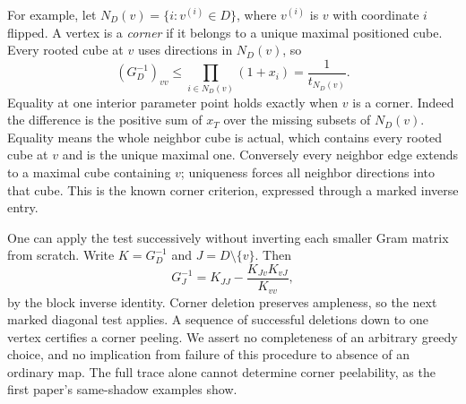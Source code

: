 \documentclass[11pt]{article}
\theoremstyle{definition}
\begin{document}
For example, let $N_D(v)=\{i:v^{(i)}\in D\}$,
where $v^{(i)}$ is $v$ with coordinate $i$ flipped. A vertex is a
\emph{corner} if it belongs to a unique maximal positioned cube.
Every rooted cube at $v$ uses directions in $N_D(v)$, so
\begin{equation}\label{eq:corner-diagonal}
 (G_D^{-1})_{vv}\le\prod_{i\in N_D(v)}(1+x_i)
                   =\frac{1}{t_{N_D(v)}}.
\end{equation}
Equality at one interior parameter point holds exactly when $v$ is a corner.
Indeed the difference is the positive sum of $x_T$ over the missing
subsets of $N_D(v)$. Equality means the whole neighbor cube is actual,
which contains every rooted cube at $v$ and is the unique maximal one.
Conversely every neighbor edge extends to a maximal cube containing $v$;
uniqueness forces all neighbor directions into that cube. This is the
known corner criterion, expressed through a marked inverse entry.

One can apply the test successively without inverting each smaller Gram
matrix from scratch. Write $K=G_D^{-1}$ and $J=D\setminus\{v\}$. Then
\[
 G_J^{-1}=K_{JJ}-\frac{K_{Jv}K_{vJ}}{K_{vv}},
\]
by the block inverse identity. Corner deletion preserves ampleness, so the
next marked diagonal test applies. A sequence of successful deletions down
to one vertex certifies a corner peeling. We assert no completeness of an
arbitrary greedy choice, and no implication from failure of this procedure
to absence of an ordinary map. The full trace alone cannot determine
corner peelability, as the first paper's same-shadow examples show.
\end{document}
